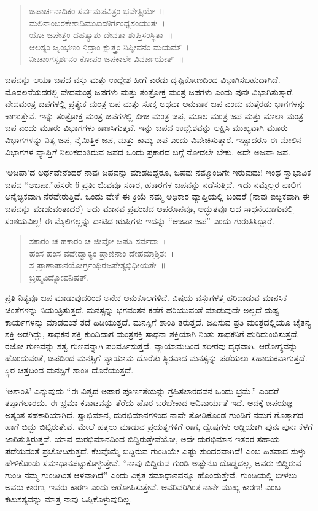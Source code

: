{\begin{verse}
ಜಪಾರ್ಚನಾದಿಕಂ ಸರ್ವಮಪವಿತ್ರಂ ಭವೇತ್ಪ್ರಿಯೇ~॥\\
ಮಲಿನಾಂಬರಕೇಶಾದಿಮುಖದೌರ್ಗಂಧ್ಯಸಂಯುತಃ~। \\
ಯೋ ಜಪೇತ್ತಂ ದಹತ್ಯಾಶು ದೇವತಾ ಶುಪ್ತಿಸಂಸ್ಥಿತಾ~॥\\
ಆಲಸ್ಯಂ ಜೃಂಭಣಂ ನಿದ್ರಾಂ ಕ್ಷುತ್ತ್ರಂ ನಿಷ್ಠೀವನಂ ಮಯಮ್~। \\
ನೀಚಾಂಗಸ್ಪರ್ಶನಂ ಕೋಪಂ ಜಪಕಾಲೇ ವಿವರ್ಜಯೇತ್~॥
\end{verse}
ಜಪವನ್ನು ಆಯಾ ಜಪದ ವಸ್ತು ಮತ್ತು ಉದ್ದೇಶ ಹೀಗೆ ಎರಡು ದೃಷ್ಟಿಕೋಣದಿಂದ ವಿಭಾಗಿಸಬಹುದಾಗಿದೆ. ಮೊದಲನೆಯದರಲ್ಲಿ ವೇದಮಂತ್ರ ಜಪಗಳು ಮತ್ತು ತಂತ್ರೋಕ್ತ ಮಂತ್ರ ಜಪಗಳು ಎಂದು ಪುನಃ ವಿಭಾಗಿಸುತ್ತಾರೆ. ವೇದಮಂತ್ರ ಜಪಗಳಲ್ಲಿ ಪ್ರತ್ಯೇಕ ಮಂತ್ರ ಜಪ ಮತ್ತು ಸೂಕ್ತ ಅಥವಾ ಅನುವಾಕ ಜಪ ಎಂದು ಮತ್ತೆರಡು ಭಾಗ\-ಗಳನ್ನು ಕಾಣುತ್ತೇವೆ. ಇನ್ನು ತಂತ್ರೋಕ್ತ ಮಂತ್ರ ಜಪಗಳಲ್ಲಿ ಬೀಜ ಮಂತ್ರ ಜಪ, ಮೂಲ ಮಂತ್ರ ಜಪ ಮತ್ತು ಮಾಲಾ ಮಂತ್ರ ಜಪ ಎಂದು ಮೂರು ವಿಭಾಗಗಳು ಕಾಣಸಿಗುತ್ತವೆ. ಇನ್ನು ಜಪದ ಉದ್ದೇಶವನ್ನು ಲಕ್ಷಿಸಿ ಮುಖ್ಯವಾಗಿ ಮೂರು ವಿಭಾಗಗಳನ್ನು ನಿತ್ಯ ಜಪ, ನೈಮಿತ್ತಿಕ ಜಪ, ಮತ್ತು ಕಾಮ್ಯ ಜಪ ಎಂದು ವಿವೇಚಿಸುತ್ತಾರೆ. ಇಷ್ಟಾದರೂ ಈ ಮೇಲಿನ ವಿಭಾಗಗಳ ವ್ಯಾಪ್ತಿಗೆ ನಿಲುಕದಂತಿರುವ ಜಪದ ಒಂದು ಪ್ರಕಾರದ ಬಗ್ಗೆ ನೋಡಲೇ ಬೇಕು. ಅದೇ ಅಜಪಾ ಜಪ.

‘ಅಜಪಾ’ದ ಅರ್ಥವೇನೆಂದರೆ ನಾವು ಜಪವನ್ನು ಮಾಡದಿದ್ದರೂ, ಜಪವು ನಮ್ಮೊಂದಿಗೇ ಇರುವುದು! ಇಂಥ ಸ್ವಾಭಾವಿಕ ಜಪದ “ಅಜಪಾ.”ಹೆಸರೇ 6 ಪ್ರತೀ ಜೀವವೂ ಸಕಾರ, ಹಕಾರಗಳ ಜಪವನ್ನು ನಡೆಸುತ್ತಿದೆ. ಇದು ನಮ್ಮೆಲ್ಲರ ಪಾಲಿಗೆ ಅನೈಚ್ಛಿಕವಾಗಿ ನೆರವೇರುತ್ತಿದೆ. ಒಂದು ವೇಳೆ ಈ ಕ್ರಿಯೆ ನಮ್ಮ ಅಧಿಕಾರ ವ್ಯಾಪ್ತಿಯಲ್ಲಿ ಬಂದರೆ (ನಾವು ಐಚ್ಛಿಕ\-ವಾಗಿ ಈ ಜಪವನ್ನು ಮಾಡುವಂತಾದರೆ) ಅದು ಮಾನವ ಪ್ರಪಂಚದ ಅಪ\-ರೂಪವೂ, ಅದ್ಭುತವೂ ಆದ ಸಾಧನೆಯಾಗುವಲ್ಲಿ ಸಂಶಯವಿಲ್ಲ! ಈ ಮೈಲಿಗಲ್ಲನ್ನು ದಾಟಿದ ಋಷಿಗಳು ಇದನ್ನು “ಅಜಪಾ ಜಪ” ಎಂದು ಗುರುತಿಸಿದ್ದಾರೆ.
\begin{verse}
ಸಕಾರಂ ಚ ಹಕಾರಂ ಚ ಜೀವೋ ಜಪತಿ ಸರ್ವದಾ~।  \\
ಹಂಸ ಹಂಸ ವದೇದ್ವಾಕ್ಯಂ ಪ್ರಾಣಿನಾಂ ದೇಹಮಾಶ್ರಿತಃ~। \\
ಸ ಪ್ರಾಣಾಪಾನಯೋರ್ಗ್ರಂಥಿರಜಪೇತ್ಯಭಿಧೀಯತೇ~॥\\
\hspace{5cm}ಬ್ರಹ್ಮವಿದ್ಯೋಪನಿಷತ್.
\end{verse}
ಪ್ರತಿ ನಿತ್ಯವೂ ಜಪ ಮಾಡುವುದರಿಂದ ಅನೇಕ ಅನುಕೂಲಗಳಿವೆ. ವಿಷಯ ವಸ್ತುಗಳತ್ತ ಹರಿದಾಡುವ ಮಾನಸಿಕ ಚಿಂತೆಗಳನ್ನು ನಿಯಂತ್ರಿಸುತ್ತದೆ. ಮನಸ್ಸನ್ನು ಭಗವಂತನ ಕಡೆಗೆ ಹರಿಯುವಂತೆ ಮಾಡುವುದೇ ಅಲ್ಲದೆ ದುಷ್ಟ ಕಾರ್ಯಗಳನ್ನು ಮಾಡದಂತೆ ತಡೆ ಹಿಡಿಯುತ್ತದೆ. ಮನಸ್ಸಿಗೆ ಶಾಂತಿ ತರುತ್ತದೆ. ಜಪಿಸುವ ಪ್ರತಿ ಮಂತ್ರದಲ್ಲಿಯೂ ಚೈತನ್ಯ ಶಕ್ತಿ ಅಡಗಿದ್ದು, ಸಾಧಕನ ಶಕ್ತಿ ಕುಂದಿದಾಗ ಮಂತ್ರಶಕ್ತಿ ಸಾಧನಾ ಶಕ್ತಿಯಾಗಿ ನಿಂತು ಸಾಧಕ\-ನಿಗೆ ಹುರಿದುಂಬಿಸುತ್ತದೆ. ರಜೋ ಗುಣವನ್ನು ಸತ್ವ ಗುಣವನ್ನಾಗಿ ಪರಿವರ್ತಿಸುತ್ತದೆ. ವ್ಯಾಯಾಮದಿಂದ ಶರೀರವು ದೃಢವಾಗಿ, ಆರೋಗ್ಯವನ್ನು ಹೊಂದುವಂತೆ, ಜಪದಿಂದ ಮನಸ್ಸಿಗೆ ವ್ಯಾಯಾಮ ದೊರೆತು ಸ್ಥಿರವಾದ ಮನಸ್ಸನ್ನು ಪಡೆಯಲು ಸಹಾಯಕ\-ವಾಗುತ್ತದೆ. ಸ್ಥಿರ  ಚಿತ್ತದಿಂದ ಮನಸ್ಸಿಗೆ ಶಾಂತಿ ದೊರೆಯುತ್ತದೆ.

‘ಅಶಾಂತಿ’ ಎನ್ನುವುದು “ಈ ವಿಶ್ವದ ಅಪಾರ ಪೂರ್ಣತೆಯನ್ನು ಗ್ರಹಿಸಲಾರದವನ ಒಂದು ಭ್ರಮೆ.” ಎಂದರೆ ತಪ್ಪಾಗಲಾರದು. ಈ ಭ್ರಮಾ ಕವಾಟವನ್ನು ತೆರೆದು ಹೊರ ಬರಬೇಕಾದ ಅನಿವಾರ್ಯತೆ ಇದೆ. ಅದಕ್ಕೆ ಜಪಯಜ್ಞ ಅತ್ಯಂತ ಸಹಕಾರಿಯಾಗಿದೆ. ಸ್ವಾಭಿಮಾನ, ದುರಭಿಮಾನಗಳಿಂದ ನಾವೇ ತೋಡಿಕೊಂಡ ಗುಂಡಿಗೆ ನಮಗೆ ಗೊತ್ತಾಗದ ಹಾಗೆ ಬಿದ್ದು ಬಿಟ್ಟಿರುತ್ತೇವೆ. ಮೇಲೆ ಹತ್ತಲು ಮಾಡುವ ಪ್ರಯತ್ನಗಳಿಗೆ ರಾಗ, ದ್ವೇಷಗಳು ಅಡ್ಡಿಯಾಗಿ ಪುನಃ ಪುನಃ ಕೆಳಗೆ ಜಾರಿಸುತ್ತಿರುತ್ತವೆ. ಯಾವ ದುರಭಿಮಾನದಿಂದ ಬಿದ್ದಿರುತ್ತೇವೆಯೋ, ಅದೇ ದುರಭಿಮಾನ ಇತರರ ಸಹಾಯ ಪಡೆಯದಂತೆ ಪ್ರಚೋದಿಸುತ್ತದೆ. ಕೆಲವೊಮ್ಮೆ ಬಿದ್ದಿರುವ ಗುಂಡಿಯೇ ಎಷ್ಟು ಸುಂದರವಾಗಿದೆ! ಎಂಬ ಹಿತವಾದ ಸುಳ್ಳು ಹೇಳಿಕೊಂಡು ಸಮಾಧಾನಪಟ್ಟುಕೊಳ್ಳುತ್ತೇವೆ. “ನಾವು ಬಿದ್ದಿರುವ ಗುಂಡಿ ಅಷ್ಟೇನೂ ದೊಡ್ಡದಲ್ಲ, ಅವರು ಬಿದ್ದಿರುವ ಗುಂಡಿ ನಮ್ಮ ಗುಂಡಿಗಿಂತ ಆಳವಾಗಿದೆ” ಎಂದು ವಿಕೃತ ಸಮಾಧಾನವನ್ನೂ ಹೊಂದುತ್ತೇವೆ. ಗುಂಡಿಯಲ್ಲಿ ಬೀಳಲು ಅವರು ಕಾರಣ, ಇವರು ಕಾರಣ ಎಂದು ಆರೋಪಿಸುತ್ತೇವೆ. ಅವರಿವರಿಗಿಂತ ನಾನೇ ಮುಖ್ಯ ಕಾರಣ! ಎಂಬ ಕಟುಸತ್ಯವನ್ನು ಮಾತ್ರ ನಾವು ಒಪ್ಪಿಕೊಳ್ಳುವುದಿಲ್ಲ.

}
